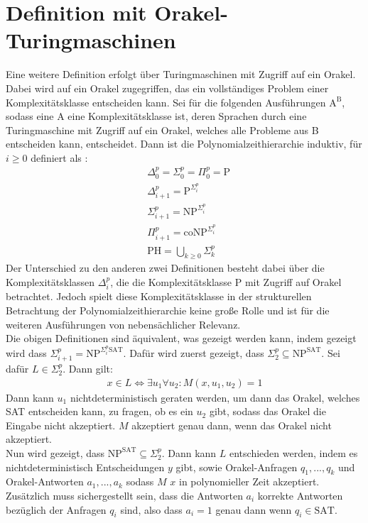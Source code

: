 \section{Definition mit Orakel-Turingmaschinen} \label{section: Definition PH mit Orakel-Turingmaschinen}
Eine weitere Definition erfolgt über Turingmaschinen mit Zugriff auf ein Orakel. Dabei wird auf ein Orakel zugegriffen,
das ein vollständiges Problem einer Komplexitätsklasse entscheiden kann. Sei für die folgenden Ausführungen $\text{A}^\text{B}$, sodass eine A eine Komplexitätsklasse ist, deren Sprachen durch eine Turingmaschine mit Zugriff auf ein Orakel, welches alle Probleme aus B entscheiden kann, entscheidet. 
Dann ist die Polynomialzeithierarchie induktiv, für $i \geq 0$ definiert als \cite{rothe_komplexitatstheorie_2008}:
\begin{align*}
    & \Delta^p_0 = \Sigma^p_0 = \Pi^p_0 = \text{P} \\
    & \Delta^p_{i+1} = \text{P}^{\Sigma^p_i} \\
    &\Sigma^p_{i+1} = \text{NP}^{\Sigma^p_i} \\
    & \Pi^p_{i+1} = \text{coNP}^{\Sigma^p_i} \\
    & \text{PH} = \bigcup_{k \geq 0} \Sigma^p_k
\end{align*}
Der Unterschied zu den anderen zwei Definitionen besteht dabei über die Komplexitätsklassen $\Delta^p_i$, die die Komplexitätsklasse P
mit Zugriff auf Orakel betrachtet. Jedoch spielt diese Komplexitätsklasse in der strukturellen Betrachtung der Polynomialzeithierarchie keine große
Rolle und ist für die weiteren Ausführungen von nebensächlicher Relevanz. \\

\noindent Die obigen Definitionen sind äquivalent, was gezeigt werden kann, indem gezeigt wird dass $\Sigma^p_{i+1} = \text{NP}^{\Sigma^p_i \text{SAT}}$.
Dafür wird zuerst gezeigt, dass $\Sigma^p_2 \subseteq \text{NP}^{\text{SAT}}$. Sei dafür $L \in \Sigma^p_2$. Dann gilt: 
\begin{align*}
    x \in L \Leftrightarrow \exists u_1 \forall u_2 : M(x, u_1, u_2) = 1
\end{align*}
Dann kann $u_1$ nichtdeterministisch geraten werden, um dann das Orakel, welches SAT entscheiden kann, zu fragen, ob es ein $u_2$ gibt, sodass das Orakel die Eingabe nicht akzeptiert.
$M$ akzeptiert genau dann, wenn das Orakel nicht akzeptiert. \\
Nun wird gezeigt, dass $\text{NP}^{\text{SAT}} \subseteq \Sigma^p_2 $. Dann kann $L$ entschieden werden, indem es nichtdeterministisch Entscheidungen $y$ gibt, 
sowie Orakel-Anfragen $q_1, ..., q_k$ und Orakel-Antworten $a_1, ..., a_k$ sodass $M$ $x$ in polynomieller Zeit akzeptiert. Zusätzlich muss sichergestellt sein, 
dass die Antworten $a_i$ korrekte Antworten bezüglich der Anfragen $q_i$ sind, also dass $a_i = 1$ genau dann wenn  $q_i \in \text{SAT}$.